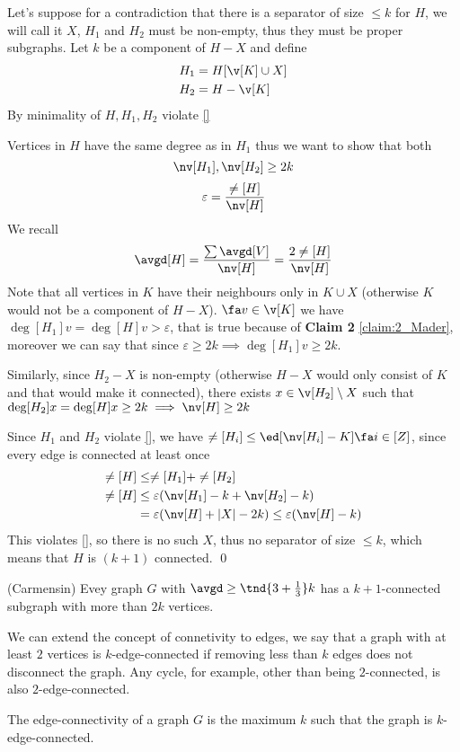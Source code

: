 \begin{prf}
    Let's suppose for a contradiction that there is a separator of size $\leq k$ for $H$, we will call it $X$, $H_1$ and $H_2$ must be non-empty, thus they must be proper subgraphs. Let $k$ be a component of $H - X$ and define
    \begin{align*}
        H_1 &= H[\v[K] \cup X]\\
        H_2 &= H - \v[K]
    \end{align*}
    By minimality of $H, H_1, H_2$ violate \ref{}

    Vertices in $H$ have the same degree as in $H_1$ thus we want to show that both
    \begin{equation*}
        \nv[H_1], \nv[H_2] \geq 2k
    \end{equation*}
    \begin{equation*}
        \varepsilon = \frac{\ne[H]}{\nv[H]}
    \end{equation*}
    We recall
    \begin{equation*}
        \avgd[H] = \frac{\sum\avgd[V]}{\nv[H]} = \frac{2\ne[H]}{\nv[H]}
    \end{equation*}
    Note that all vertices in $K$ have their neighbours only in $K \cup X$ (otherwise $K$ would not be a component of $H - X$). $\fa v \in \v[K]$ we have $\deg[H_1]{v} = \deg[H]{v} > \varepsilon$, that is true because of \textbf{Claim 2} \ref{claim:2_Mader}, moreover we can say that since $\varepsilon \geq 2k \implies \deg[H_1]{v} \geq 2k$.
    
    Similarly, since $H_2 - X$ is non-empty (otherwise $H - X$ would only consist of $K$ and that would make it connected), there exists $x \in \v[H_2] \setminus X$ such that $\deg[H_2]{x} = \deg[H]{x} \geq 2k \implies \nv[H] \geq 2k$

    Since $H_1$ and $H_2$ violate \ref{}, we have $\ne[H_i] \leq \ed[\nv[H_i] - K] \fa i \in [Z]$, since every edge is connected at least once
    \begin{align*}
        \ne[H] &\leq \ne[H_1] + \ne[H_2]\\
        \ne[H] &\leq \varepsilon(\nv[H_1] - k + \nv[H_2] - k)\\
        &= \varepsilon(\nv[H] + |X| - 2k) \leq \varepsilon(\nv[H] - k)
    \end{align*}
    This violates \ref{}, so there is no such $X$, thus no separator of size $\leq k$, which means that $H$ is $(k + 1)$ connected. \qed
\end{prf}
\begin{customtheorem}{(Carmensin)}
    \label{theorem:carmesin}
    Evey graph $G$ with $\avgd \geq \tnd{3 + \frac{1}{3}}k$ has a $k + 1$-connected subgraph with more than $2k$ vertices.
\end{customtheorem}
We can extend the concept of connetivity to edges, we say that a graph with at least $2$ vertices is $k$-edge-connected if removing less than $k$ edges does not disconnect the graph. Any cycle, for example, other than being $2$-connected, is also $2$-edge-connected.
\begin{definition}
    The edge-connectivity of a graph $G$ is the maximum $k$ such that the graph is $k$-edge-connected.    
\end{definition}